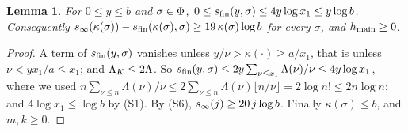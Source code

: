 \documentclass[10pt]{amsart}
\newtheorem{lemma}[theorem]{Lemma}
\theoremstyle{definition}
\theoremstyle{remark}
\begin{document}
\begin{lemma}\label{an:lem-hmain}
For $0\le y\le b$ and $\sigma\in\Phi$,
$0\le s_{\mathrm{fin}}(y,\sigma)\le4y\log x_1\le y\log b$. Consequently
$s_{\infty}(\kappa(\sigma))-s_{\mathrm{fin}}(\kappa(\sigma),\sigma)\ge19\,\kappa(\sigma)\log b$
for every $\sigma$, and $h_{\mathrm{main}}\ge0$.
\end{lemma}
\begin{proof}
A term of $s_{\mathrm{fin}}(y,\sigma)$ vanishes unless $y/\nu>\kappa(\cdot)\ge a/x_1$,
that is unless $\nu<yx_1/a\le x_1$; and $\Lambda_K\le2\Lambda$. So
$s_{\mathrm{fin}}(y,\sigma)\le2y\sum_{\nu\le x_1}\Lambda(\nu)/\nu\le4y\log x_1$, where we
used $n\sum_{\nu\le n}\Lambda(\nu)/\nu\le2\sum_{\nu\le n}\Lambda(\nu)\lfloor n/\nu\rfloor=2\log n!\le2n\log n$;
and $4\log x_1\le\log b$ by (S1). By (S6), $s_{\infty}(j)\ge20\,j\log b$. Finally
$\kappa(\sigma)\le b$, and $m,k\ge0$.
\end{proof}
\end{document}
